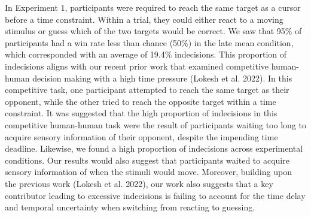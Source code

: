 \documentclass[12pt,letterpaper]{article}
\begin{document}
In Experiment 1, participants were required to reach the same target as a cursor before a time constraint. Within a trial, they could either react to a moving stimulus or guess which of the two targets would be correct. We saw that 95\% of participants had a win rate less than chance (50\%) in the late mean condition, which corresponded with an average of 19.4\% indecisions. This proportion of indecisions aligns with our recent prior work that examined competitive human-human decision making with a high time pressure (Lokesh et al. 2022). In this competitive task, one participant attempted to reach the same target as their opponent, while the other tried to reach the opposite target within a time constraint. It was suggested that the high proportion of indecisions in this competitive human-human task were the result of participants waiting too long to acquire sensory information of their opponent, despite the impending time deadline. Likewise, we found a high proportion of indecisions across experimental conditions. Our results would also suggest that participants waited to acquire sensory information of when the stimuli would move. Moreover, building upon the previous work (Lokesh et al. 2022), our work also suggests that a key contributor leading to excessive indecisions is failing to account for the time delay and temporal uncertainty when switching from reacting to guessing.
\end{document}
